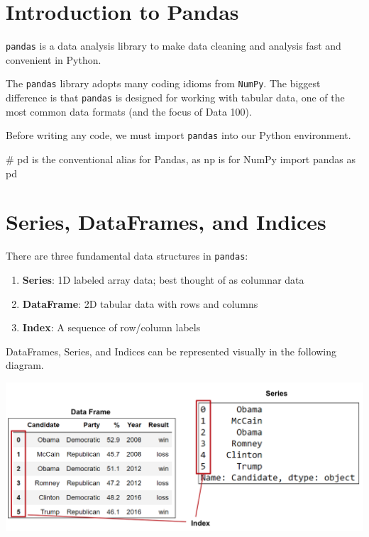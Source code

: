 \documentclass[
  letterpaper,
  DIV=11,
  numbers=noendperiod]{scrreprt}
\newenvironment{Shaded}{\begin{snugshade}}{\end{snugshade}}
\newcommand{\CommentTok}[1]{\textcolor[rgb]{0.37,0.37,0.37}{#1}}
\newcommand{\ImportTok}[1]{\textcolor[rgb]{0.00,0.46,0.62}{#1}}
\newcommand{\NormalTok}[1]{\textcolor[rgb]{0.00,0.23,0.31}{#1}}
\providecommand{\tightlist}{%
  \setlength{\itemsep}{0pt}\setlength{\parskip}{0pt}}\usepackage{longtable,booktabs,array}
\begin{document}
\hypertarget{introduction-to-pandas}{%
\section{Introduction to Pandas}\label{introduction-to-pandas}}

\texttt{pandas} is a data analysis library to make data cleaning and
analysis fast and convenient in Python.

The \texttt{pandas} library adopts many coding idioms from
\texttt{NumPy}. The biggest difference is that \texttt{pandas} is
designed for working with tabular data, one of the most common data
formats (and the focus of Data 100).

Before writing any code, we must import \texttt{pandas} into our Python
environment.

\begin{Shaded}
\begin{Highlighting}[]
\CommentTok{\# \textasciigrave{}pd\textasciigrave{} is the conventional alias for Pandas, as \textasciigrave{}np\textasciigrave{} is for NumPy}
\ImportTok{import}\NormalTok{ pandas }\ImportTok{as}\NormalTok{ pd}
\end{Highlighting}
\end{Shaded}

\hypertarget{series-dataframes-and-indices}{%
\section{Series, DataFrames, and
Indices}\label{series-dataframes-and-indices}}

There are three fundamental data structures in \texttt{pandas}:

\begin{enumerate}
\def\labelenumi{\arabic{enumi}.}
\tightlist
\item
  \textbf{Series}: 1D labeled array data; best thought of as columnar
  data
\item
  \textbf{DataFrame}: 2D tabular data with rows and columns
\item
  \textbf{Index}: A sequence of row/column labels
\end{enumerate}

DataFrames, Series, and Indices can be represented visually in the
following diagram.

\includegraphics{pandas_1/images/df_series_index.png}
\end{document}
